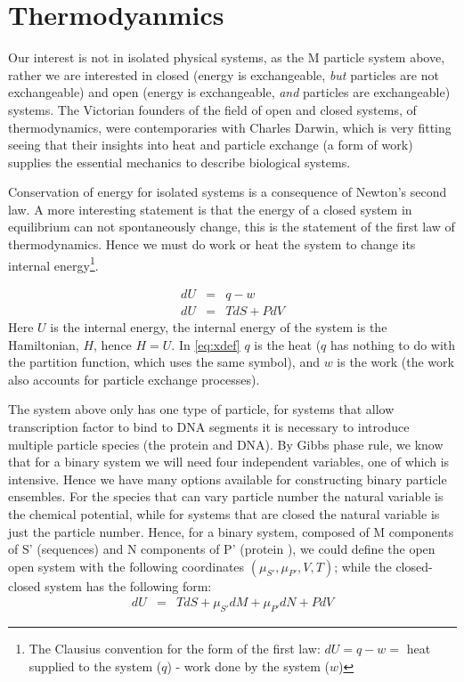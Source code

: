 
\section*{Thermodyanmics}
Our interest is not in isolated physical systems, as the M particle system above, rather we are interested in closed (energy is exchangeable, \textit{but} particles are not exchangeable) and open (energy is exchangeable, \textit{and} particles are exchangeable) systems.  The Victorian founders of the field of open and closed systems, of thermodynamics, were contemporaries with Charles Darwin, which is very fitting seeing that their insights into heat and particle exchange (a form of work) supplies the essential mechanics to describe biological systems.

Conservation of energy for isolated systems is a consequence of Newton's second law. A more interesting statement is that the energy of a closed system in equilibrium can not spontaneously change, this is the statement of the first law of thermodynamics.  Hence we must do work or heat the system to change its internal energy\footnote{The Clausius convention for the form of the first law: $dU = q -w =$ heat supplied to the system ($q$) - work done by the system ($w$)}. 

\begin{eqnarray}
  dU &=& q - w \label{eq:xdef} \\  \nonumber
  dU &=& TdS + PdV
\end{eqnarray}
 Here $U$ is the internal energy, the internal energy of the system is the Hamiltonian, $H$, hence $H=U$.  In \eqref{eq:xdef} $q$ is the heat ($q$ has nothing to do with the partition function, which uses the same symbol), and $w$ is the work (the work also accounts for particle exchange processes).    
      
 The system above only has one type of particle, for systems that allow transcription factor to bind to DNA segments it is necessary to introduce multiple particle species (the protein and DNA).  By Gibbs phase rule, we know that for a binary system we will need four independent variables, one of which is intensive.  Hence we have many options available for constructing binary particle ensembles.  For the species that can vary particle number the natural variable is the chemical potential, while for systems that are closed the natural variable is just the particle number.  Hence, for a binary system, composed of M components of S' (sequences) and N components of P' (protein ), we could define the open open system with the following coordinates $( \mu_{S'}, \mu_{P'},V,T)$; while the closed-closed system has the following form:
   \begin{eqnarray}
  dU &=& TdS + \mu_{S'} dM + \mu_{P'} dN + PdV
\end{eqnarray}\label{closedclosed} 
%
  
